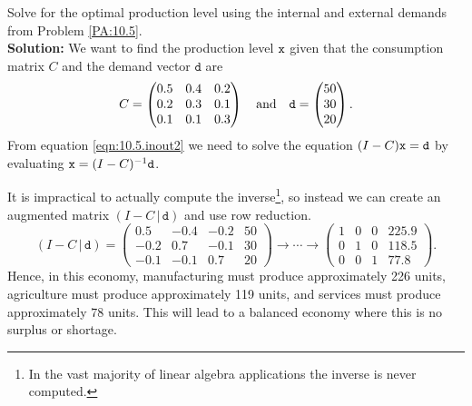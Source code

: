 \begin{example}
Solve for the optimal production level using the internal and external demands from
Problem \ref{PA:10.5}.
\\{\bf Solution:}
We want to find the production level $\texttt{x}$ given that the consumption matrix $C$ and the
demand vector $\texttt{d}$ are 
\[ C = \begin{pmatrix} 0.5 & 0.4 & 0.2 \\ 0.2 & 0.3 & 0.1 \\ 0.1 & 0.1 & 0.3 \end{pmatrix} \quad \text{and}
    \quad \texttt{d} = \begin{pmatrix} 50 \\ 30 \\ 20 \end{pmatrix}. \]
From equation \eqref{eqn:10.5.inout2} we need to solve the equation $(I-C) \texttt{x} = \texttt{d}$ by
evaluating $\texttt{x} = (I-C)^{-1} \texttt{d}$. 

It is impractical to actually compute the inverse\footnote{In the vast majority of linear
algebra applications the inverse is never computed.}, so instead we can create an
augmented matrix $(I-C \, | \, \texttt{d})$ and use row reduction.
\[ (I-C \, | \, \texttt{d}) = \left( \begin{array}{ccc|c} 0.5 & -0.4 & -0.2 & 50 \\ -0.2 & 0.7 &
        -0.1 & 30 \\ -0.1 & -0.1 & 0.7 & 20 \end{array} \right) \to \cdots \to \left(
        \begin{array}{ccc|c} 1 & 0 & 0 & 225.9 \\ 0 & 1 & 0 & 118.5 \\ 0 & 0 & 1 & 77.8
        \end{array} \right). \]
Hence, in this economy, manufacturing must produce approximately 226 units, agriculture
must produce approximately 119 units, and services must produce approximately 78 units.
This will lead to a balanced economy where this is no surplus or shortage.
\end{example}

